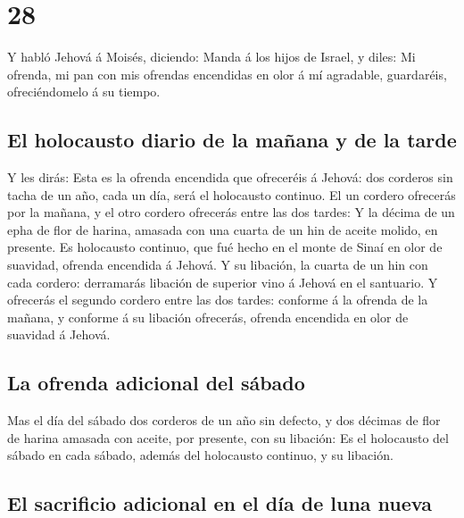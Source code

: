 \hypertarget{section-27}{%
\section{28}\label{section-27}}

 Y habló Jehová á Moisés, diciendo:  Manda á los
hijos de Israel, y diles: Mi ofrenda, mi pan con mis ofrendas encendidas
en olor á mí agradable, guardaréis, ofreciéndomelo á su tiempo.

\hypertarget{el-holocausto-diario-de-la-mauxf1ana-y-de-la-tarde}{%
\subsection{El holocausto diario de la mañana y de la
tarde}\label{el-holocausto-diario-de-la-mauxf1ana-y-de-la-tarde}}

 Y les dirás: Esta es la ofrenda encendida que ofreceréis á
Jehová: dos corderos sin tacha de un año, cada un día, será el
holocausto continuo.  El un cordero ofrecerás por la mañana,
y el otro cordero ofrecerás entre las dos tardes:  Y la
décima de un epha de flor de harina, amasada con una cuarta de un hin de
aceite molido, en presente.  Es holocausto continuo, que fué
hecho en el monte de Sinaí en olor de suavidad, ofrenda encendida á
Jehová.  Y su libación, la cuarta de un hin con cada
cordero: derramarás libación de superior vino á Jehová en el santuario.
 Y ofrecerás el segundo cordero entre las dos tardes:
conforme á la ofrenda de la mañana, y conforme á su libación ofrecerás,
ofrenda encendida en olor de suavidad á Jehová.

\hypertarget{la-ofrenda-adicional-del-suxe1bado}{%
\subsection{La ofrenda adicional del
sábado}\label{la-ofrenda-adicional-del-suxe1bado}}

 Mas el día del sábado dos corderos de un año sin defecto, y
dos décimas de flor de harina amasada con aceite, por presente, con su
libación:  Es el holocausto del sábado en cada sábado,
además del holocausto continuo, y su libación.

\hypertarget{el-sacrificio-adicional-en-el-duxeda-de-luna-nueva}{%
\subsection{El sacrificio adicional en el día de luna
nueva}\label{el-sacrificio-adicional-en-el-duxeda-de-luna-nueva}}


